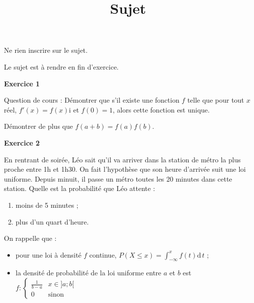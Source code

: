 \documentclass[12pt,a4paper,french]{article}
\author{}
\title{Sujet \no{7}}
\date{}
\begin{document}
\maketitle
\begin{center}Ne rien inscrire sur le sujet.

  Le sujet est à rendre en fin d'exercice.
\end{center}

\bigskip

\textbf{Exercice 1}

Question de cours : Démontrer que s'il existe une fonction $f$ telle que
pour tout $x$ réel, $f'(x) = f(x)$i et $f(0) = 1$, alors cette fonction
est unique.

Démontrer de plus que $f(a+b) = f(a)f(b)$.

\medskip

\textbf{Exercice 2}

En rentrant de soirée, Léo sait qu'il va arriver dans la station de
métro la plus proche entre 1h et 1h30. On fait l'hypothèse que son heure
d'arrivée suit une loi uniforme. Depuis minuit, il passe un métro toutes
les 20 minutes dans cette station. Quelle est la probabilité que Léo
attente :
\begin{enumerate}
  \item moins de 5 minutes ;
  \item plus d'un quart d'heure.
\end{enumerate}

On rappelle que :
\begin{itemize}
  \item pour une loi à densité $f$ continue, $P(X \leq x) =
    \int_{-\infty}^x f(t) \mathrm{d}\,t$ ;
  \item la densité de probabilité de la loi uniforme entre $a$ et $b$
    est $f : \left\lbrace \begin{array}{lr} \frac1{b-a} & x \in ]a;b[
    \\ 0 & \text{sinon}\end{array}\right.$
\end{itemize}
\end{document}
